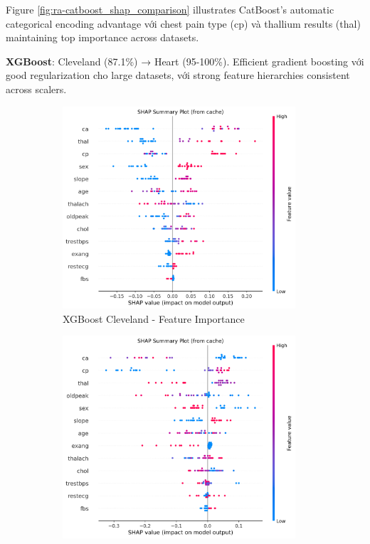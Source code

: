 Figure \ref{fig:ra-catboost_shap_comparison} illustrates CatBoost's automatic categorical encoding advantage với chest pain type (cp) và thallium results (thal) maintaining top importance across datasets.

\textbf{XGBoost}: Cleveland (87.1\%) → Heart (95-100\%). Efficient gradient boosting với good regularization cho large datasets, với strong feature hierarchies consistent across scalers.

\begin{figure}[H]
\centering
\begin{subfigure}[b]{0.48\textwidth}
\centering
\includegraphics[width=0.95\textwidth]{Result/cleveland_dataset/XGBoost/SHAP/Summary.png}
\caption{XGBoost Cleveland - Feature Importance}
\label{fig:xgboost_shap_cleveland_analysis}
\end{subfigure}
\hfill
\begin{subfigure}[b]{0.48\textwidth}
\centering
\includegraphics[width=0.95\textwidth]{Result/heart_dataset/XGBoost/SHAP/Summary.png}

\end{subfigure}
\end{figure}
